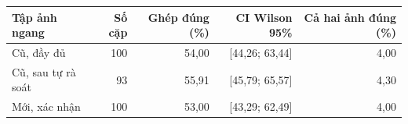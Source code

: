 \begin{tabular}{@{}lrrrr@{}}
\toprule
Tập ảnh ngang & Số cặp & Ghép đúng (\%) & CI Wilson 95\% & Cả hai ảnh đúng (\%) \\
\midrule
Cũ, đầy đủ & 100 & 54,00 & [44,26; 63,44] & 4,00 \\
Cũ, sau tự rà soát & 93 & 55,91 & [45,79; 65,57] & 4,30 \\
Mới, xác nhận & 100 & 53,00 & [43,29; 62,49] & 4,00 \\
\bottomrule
\end{tabular}
